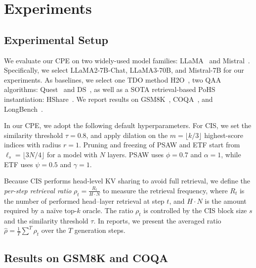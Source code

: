 
\section{Experiments}



\subsection{Experimental Setup}

We evaluate our CPE on two widely-used model families: LLaMA~\cite{touvron2023llama} and Mistral~\cite{jiang2023mistral7b}. Specifically, we select LLaMA2-7B-Chat, LLaMA3-70B, and Mistral-7B for our experiments. As baselines, we select one TDO method H2O~\cite{zhang2023h2o}, two QAA algorithms: Quest~\cite{tang2406quest} and DS~\cite{yang2024post}, as well as a SOTA retrieval-based PoHS instantiation: HShare~\cite{wuhshare}. We report results on GSM8K~\cite{cobbe2021gsm8k}, COQA~\cite{reddy2019coqa}, and LongBench~\cite{bai2023longbench}.


In our CPE, we adopt the following default hyperparameters. For CIS, we set the similarity threshold $\tau\!=\!0.8$, and apply dilation on the $m \!=\! \lfloor k/3\rfloor$ highest-score indices with radius $r=1$. Pruning and freezing of PSAW and ETF start from $\ell_s \!=\! \lfloor 3N/4 \rfloor$ for a model with $N$ layers. PSAW uses $\phi \!=\! 0.7$ and $\alpha \!=\! 1$, while ETF uses $\psi \!=\! 0.5$ and $\gamma \!=\! 1$. 

Because CIS performs head-level KV sharing to avoid full retrieval, we define the \emph{per-step retrieval ratio} $\rho_t\!=\!\frac{R_t}{H\cdot N}$ to measure the retrieval frequency, where $R_t$ is the number of performed head–layer retrieval at step $t$, and $H\cdot N$ is the amount required by a naïve top-$k$ oracle. The ratio $\rho_t$ is controlled by the CIS block size $s$ and the similarity threshold $\tau$. In reports, we present the averaged ratio $\hat{\rho}=\tfrac{1}{T}\sum^{T}\rho_t$ over the $T$ generation steps. 


\subsection{Results on GSM8K and COQA}
\label{sec:gsm8k&coqa}

